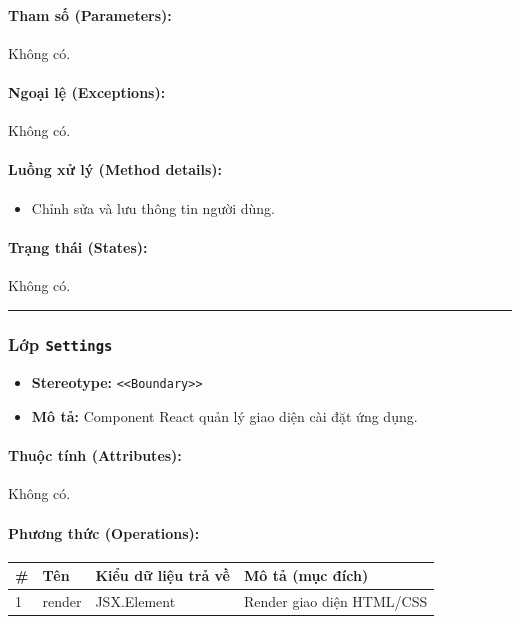 \documentclass[12pt,a4paper]{article}
\begin{document}
\paragraph{Tham số (Parameters):}
Không có.

\paragraph{Ngoại lệ (Exceptions):}
Không có.

\paragraph{Luồng xử lý (Method details):}
\begin{itemize}[leftmargin=*]
    \item Chỉnh sửa và lưu thông tin người dùng.
\end{itemize}


\paragraph{Trạng thái (States):}
Không có.

\vskip 0.5cm
\noindent\rule{\textwidth}{0.5pt}
\vskip 0.5cm

\subsubsection{Lớp \texttt{Settings}}
\begin{itemize}[leftmargin=*]
    \item \textbf{Stereotype:} \texttt{\textless{}\textless{}Boundary\textgreater{}\textgreater{}}
    \item \textbf{Mô tả:} Component React quản lý giao diện cài đặt ứng dụng.
\end{itemize}

\paragraph{Thuộc tính (Attributes):}
Không có.

\paragraph{Phương thức (Operations):}
\begin{longtable}{|p{0.6cm}|p{3.8cm}|p{2.6cm}|p{6.5cm}|}
\hline
\textbf{\#} & \textbf{Tên} & \textbf{Kiểu dữ liệu trả về} & \textbf{Mô tả (mục đích)} \\ \hline
\endhead
1 & render & JSX.Element & Render giao diện HTML/CSS \\ \hline
\end{longtable}
\end{document}
